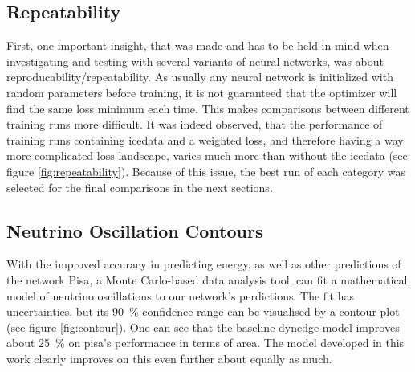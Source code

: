 \documentclass[a4paper,10pt]{scrartcl}
\begin{document}
\subsection{Repeatability}

First, one important insight, that was made and has to be held in mind when investigating and testing with several variants of neural networks, was about reproducability/repeatability.
As usually any neural network is initialized with random parameters before training, it is not guaranteed that the optimizer will find the same loss minimum each time.
This makes comparisons between different training runs more difficult.
It was indeed observed, that the performance of training runs containing icedata and a weighted loss, and therefore having a way more complicated loss landscape, varies much more than without the icedata (see figure \ref{fig:repeatability}).
Because of this issue, the best run of each category was selected for the final comparisons in the next sections.

\subsection{Neutrino Oscillation Contours}

With the improved accuracy in predicting energy, as well as other predictions of the network Pisa, a Monte Carlo-based data analysis tool, can fit a mathematical model of neutrino oscillations to our network's perdictions.
The fit has uncertainties, but its \SI{90}{\%} confidence range can be visualised by a contour plot (see figure \ref{fig:contour}).
One can see that the baseline dynedge model improves about \SI{25}{\%} on pisa's performance in terms of area.
The model developed in this work clearly improves on this even further about equally as much.
\end{document}
